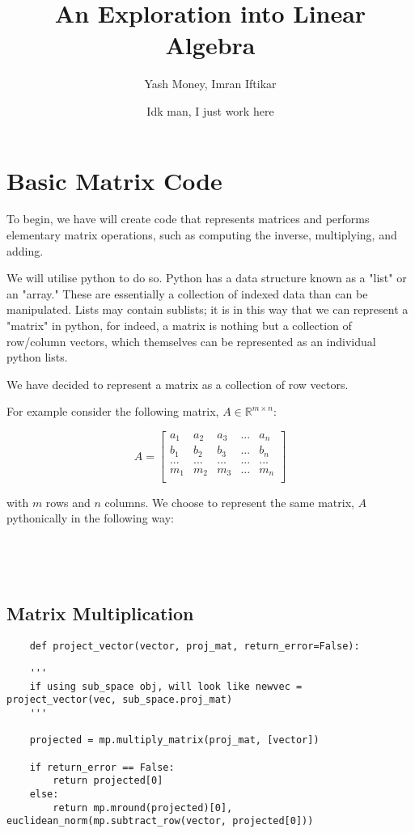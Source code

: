 \documentclass[12pt, a4paper]{article}
\title{An Exploration into Linear Algebra}
\author{Yash Money, Imran Iftikar}
\date{Idk man, I just work here}
\begin{document}
\maketitle

\section{Basic Matrix Code}

To begin, we have will create code that represents matrices and
performs elementary matrix operations, such as computing the inverse, 
multiplying, and adding. 

We will utilise python to do so. Python has a data structure known as a "list" or an "array."
These are essentially a collection of indexed data than can be manipulated. Lists may contain sublists; it is in this way
that we can represent a "matrix" in python, for indeed, a matrix is nothing but a collection of row/column vectors, which themselves
can be represented as an individual python lists. 

We have decided to represent a matrix as a collection of row vectors.

For example consider the following matrix, $ A \in \mathbb{R}^{m\times n} $: 

\begin{equation*}
    A =
\begin{bmatrix}
a_{1}  & a_{2} & a_{3} & ... & a_{n}\\
b_{1}  & b_{2} & b_{3} & ... & b_{n}\\
...  & ...& ... & ... & ...\\
m_{1}  & m_{2} & m_{3} & ... & m_{n}\\
\end{bmatrix}
\end{equation*}

with $m$ rows and $n$ columns. We choose to represent the same matrix, $A$ pythonically in the following way:

\begin{lstlisting}


    
\end{lstlisting}

\subsection{Matrix Multiplication}

\begin{lstlisting}
    def project_vector(vector, proj_mat, return_error=False):

    '''
    if using sub_space obj, will look like newvec = project_vector(vec, sub_space.proj_mat)
    '''
    
    projected = mp.multiply_matrix(proj_mat, [vector])

    if return_error == False:
        return projected[0]
    else:
        return mp.mround(projected)[0], euclidean_norm(mp.subtract_row(vector, projected[0]))
\end{lstlisting}
\end{document}
